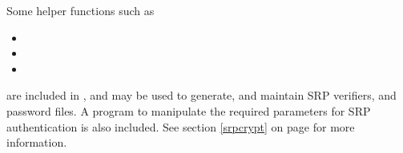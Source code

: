 Some helper functions such as
\begin{itemize}
\item {}
\item {}
\item {}
\end{itemize}
are included in \gnutls{}, and may be used to generate, and maintain
SRP verifiers, and password files. 
A program to manipulate the required parameters 
for SRP authentication is also included. See section \ref{srpcrypt} on 
page \pageref{srpcrypt} for more information.

